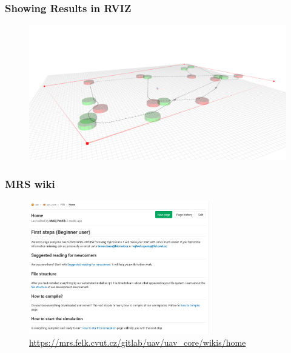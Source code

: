 \documentclass[aspectratio=1610]{beamer}
\begin{document}
\begin{frame}
  \frametitle{Showing Results in RVIZ}

  \begin{figure}
    \includegraphics[width=1.0\textwidth]{./fig/rviz_2.png}
  \end{figure}

\end{frame}


\begin{frame}
  \frametitle{MRS wiki}
  \begin{figure}
    \vspace{-1em}
    \caption*{\url{https://mrs.felk.cvut.cz/gitlab/uav/uav_core/wikis/home}}
    \includegraphics[width=0.7\textwidth]{./fig/wiki.png}
  \end{figure}

\end{frame}
\end{document}
